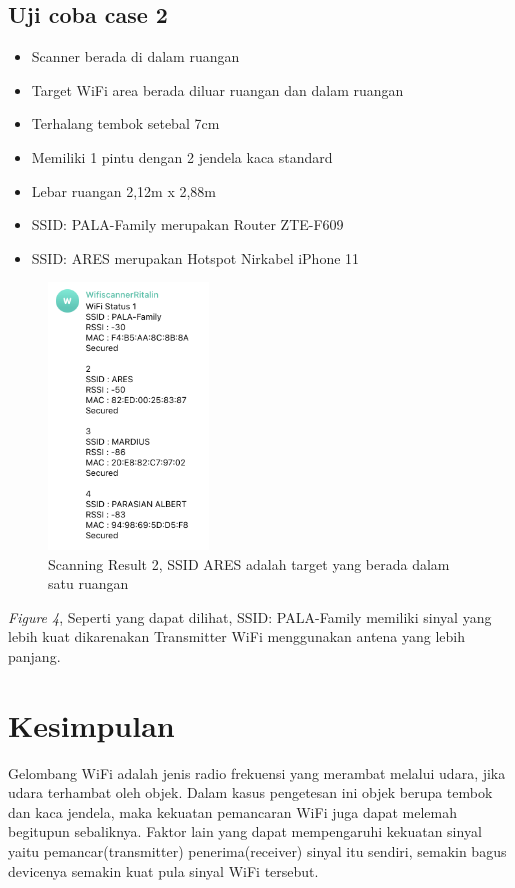 \documentclass[conference]{IEEEtran}
\begin{document}
\subsection{Uji coba case 2}

\begin{itemize}
  \item Scanner berada di dalam ruangan
  \item Target WiFi area berada diluar ruangan dan dalam ruangan
  \item Terhalang tembok setebal 7cm 
  \item Memiliki 1 pintu dengan 2 jendela kaca standard
  \item Lebar ruangan 2,12m x 2,88m
  \item SSID: PALA-Family merupakan Router ZTE-F609
  \item SSID: ARES merupakan Hotspot Nirkabel iPhone 11
\end{itemize}

\begin{figure}[h]
  \centering
  \includegraphics[width=0.38\textwidth]{scanning-result2.png}
  \caption{Scanning Result 2, SSID ARES adalah target yang berada dalam satu ruangan}
\end{figure}

\textit{Figure 4}, Seperti yang dapat dilihat, SSID: PALA-Family memiliki sinyal yang lebih kuat dikarenakan Transmitter WiFi menggunakan antena yang lebih panjang.

\section{Kesimpulan}

Gelombang WiFi adalah jenis radio frekuensi yang merambat melalui udara, jika udara terhambat oleh objek. Dalam kasus pengetesan ini objek berupa tembok dan kaca jendela, maka kekuatan pemancaran WiFi juga dapat melemah begitupun sebaliknya. Faktor lain yang dapat mempengaruhi kekuatan sinyal yaitu pemancar(transmitter) penerima(receiver) sinyal itu sendiri, semakin bagus devicenya semakin kuat pula sinyal WiFi tersebut.
\end{document}
